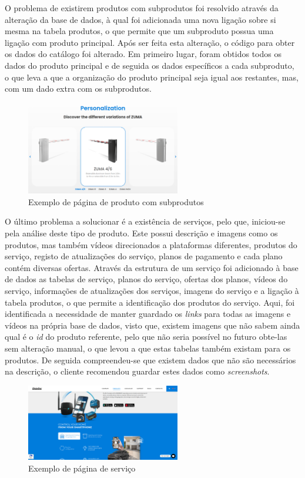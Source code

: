 O problema de existirem produtos com subprodutos foi resolvido através da alteração da base de dados, à qual foi adicionada uma nova ligação sobre si mesma na tabela produtos, o que permite que um subproduto possua uma ligação com produto principal. Após ser feita esta alteração, o código para obter os dados do catálogo foi alterado. Em primeiro lugar, foram obtidos todos os dados do produto principal e de seguida os dados específicos a cada subproduto, o que leva a que a organização do produto principal seja igual aos restantes, mas, com um dado extra com os subprodutos. 

\begin{figure}[htb]
    \centering
    \includegraphics[width=0.6\textwidth]{images/implementacao/scraper/zuma.png}
    \caption{Exemplo de página de produto com subprodutos}
    \label{fig:61}
\end{figure}

\newpage

O último problema a solucionar é a existência de serviços, pelo que, iniciou-se pela análise deste tipo de produto. Este possui descrição e imagens como os produtos, mas também vídeos direcionados a plataformas diferentes, produtos do serviço, registo de atualizações do serviço, planos de pagamento e cada plano contém diversas ofertas. 
Através da estrutura de um serviço foi adicionado à base de dados as tabelas de serviço, planos do serviço, ofertas dos planos, vídeos do serviço, informações de atualizações dos serviços, imagens do serviço e a ligação à tabela produtos, o que permite a identificação dos produtos do serviço. Aqui, foi identificada a necessidade de manter guardado os \textit{links} para todas as imagens e vídeos na própria base de dados, visto que, existem imagens que não sabem ainda qual é o \textit{id} do produto referente, pelo que não seria possível no futuro obte-las sem alteração manual, o que levou a que estas tabelas também existam para os produtos. De seguida compreendeu-se que existem dados que não são necessários na descrição, o cliente recomendou guardar estes dados como \textit{screenshots}.
\begin{figure}[htb]
    \centering
    \includegraphics[width=0.6\textwidth]{images/implementacao/scraper/mconnect.png}
    \caption{Exemplo de página de serviço}
    \label{fig:62}
\end{figure}


